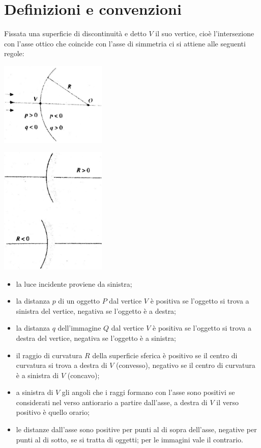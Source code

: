 \section{Definizioni e convenzioni}%
Fissata una superficie di discontinuità e detto $V$ il suo vertice, cioè l'intersezione con l'asse ottico che coincide con l'asse di simmetria ci si attiene alle seguenti regole:
\begin{center}
\includegraphics[width=2in]{immagini/otticgeom1.jpg}
\end{center}
\begin{center}
\includegraphics[width=2in]{immagini/otticgeom2.jpg}
\end{center}
\begin{itemize}
\item la luce incidente proviene da sinistra;
\item la distanza $p$ di un oggetto $P$ dal vertice $V$ è positiva se l'oggetto si trova a sinistra del vertice, negativa se l'oggetto è a destra;
\item la distanza $q$ dell'immagine $Q$ dal vertice $V$ è positiva se l'oggetto si trova a destra del vertice, negativa se l'oggetto è a sinistra;
\item il raggio di curvatura $R$ della superficie sferica è positivo se il centro di curvatura si trova a destra di $V$ (convesso), negativo se il centro di curvatura è a sinistra di $V$ (concavo);
\item a sinistra di $V$ gli angoli che i raggi formano con l'asse sono positivi se considerati nel verso antiorario a partire dall'asse, a destra di $V$ il verso positivo è quello orario;
\item le distanze dall'asse sono positive per punti al di sopra dell'asse, negative per punti al di sotto, se si tratta di oggetti; per le immagini vale il contrario.
\end{itemize}
